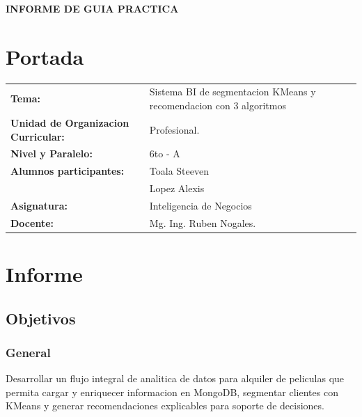 ﻿\documentclass{article}
\begin{document}
\begin{center}
    {\large \textbf{INFORME DE GUIA PRACTICA}} \\
\end{center}

\section{Portada}
\begin{flushleft}
\begin{tabular}{ l l }
    \textbf{Tema:} & Sistema BI de segmentacion KMeans y recomendacion con 3 algoritmos \\
    \textbf{Unidad de Organizacion Curricular:} & Profesional. \\
    \textbf{Nivel y Paralelo:} & 6to - A \\
    \textbf{Alumnos participantes:} & Toala Steeven \\
    &Lopez Alexis\\
    \textbf{Asignatura:} & Inteligencia de Negocios \\
    \textbf{Docente:} & Mg. Ing. Ruben Nogales. \\
\end{tabular}
\end{flushleft}


\section{Informe}
\subsection{Objetivos}

\subsubsection{General}
Desarrollar un flujo integral de analitica de datos para alquiler de peliculas que permita cargar y enriquecer informacion en MongoDB, segmentar clientes con KMeans y generar recomendaciones explicables para soporte de decisiones.
\end{document}
